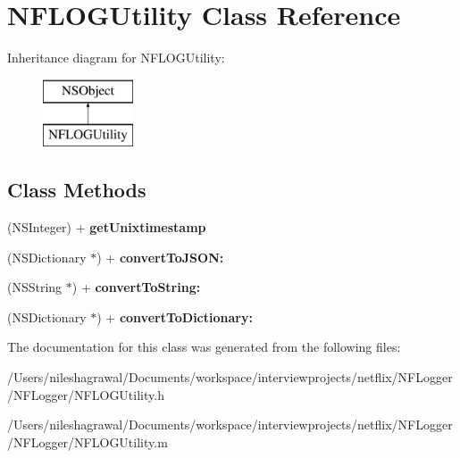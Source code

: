 \hypertarget{interface_n_f_l_o_g_utility}{}\section{N\+F\+L\+O\+G\+Utility Class Reference}
\label{interface_n_f_l_o_g_utility}
Inheritance diagram for N\+F\+L\+O\+G\+Utility\+:\begin{figure}[H]
\begin{center}
\leavevmode
\includegraphics[height=2.000000cm]{interface_n_f_l_o_g_utility}
\end{center}
\end{figure}
\subsection*{Class Methods}
\begin{DoxyCompactItemize}
\item 
\mbox{\label{interface_n_f_l_o_g_utility_a2189b25386e9d24c450548f9f2fb5ce5}} 
(N\+S\+Integer) + {\bfseries get\+Unixtimestamp}
\item 
\mbox{\label{interface_n_f_l_o_g_utility_a56488452a8e702a58785a04d5609c724}} 
(N\+S\+Dictionary $\ast$) + {\bfseries convert\+To\+J\+S\+O\+N\+:}
\item 
\mbox{\label{interface_n_f_l_o_g_utility_ade39c8489f1955b52df8b3d5983a06f2}} 
(N\+S\+String $\ast$) + {\bfseries convert\+To\+String\+:}
\item 
\mbox{\label{interface_n_f_l_o_g_utility_a2595673491da4829bbc0135616babbac}} 
(N\+S\+Dictionary $\ast$) + {\bfseries convert\+To\+Dictionary\+:}
\end{DoxyCompactItemize}


The documentation for this class was generated from the following files\+:\begin{DoxyCompactItemize}
\item 
/\+Users/nileshagrawal/\+Documents/workspace/interviewprojects/netflix/\+N\+F\+Logger/\+N\+F\+Logger/N\+F\+L\+O\+G\+Utility.\+h\item 
/\+Users/nileshagrawal/\+Documents/workspace/interviewprojects/netflix/\+N\+F\+Logger/\+N\+F\+Logger/N\+F\+L\+O\+G\+Utility.\+m\end{DoxyCompactItemize}
